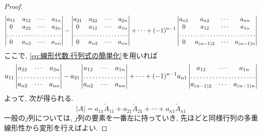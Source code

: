 \begin{proof}
            \begin{equation*}
                \begin{vmatrix}
                    a_{11} & a_{12} & \cdots & a_{1n}\\
                    0 & a_{22} & \cdots & a_{2n}\\
                    \hdotsfor{4}\\
                    0 & a_{n2} & \cdots & a_{nn}
                \end{vmatrix}
                -\begin{vmatrix}
                    a_{21} & a_{22} & \cdots & a_{2n}\\
                    0 & a_{12} & \cdots & a_{1n}\\
                    \hdotsfor{4}\\
                    0 & a_{n2} & \cdots & a_{nn}
                \end{vmatrix}
                +\cdots
                +(-1)^{n-1}\begin{vmatrix}
                    a_{n1} & a_{n2} & \cdots & a_{nn}\\
                    0 & a_{12} & \cdots & a_{1n}\\
                    \hdotsfor{4}\\
                    0 & a_{(n-1)2} & \cdots & a_{(n-1)n}\\
                \end{vmatrix}
            \end{equation*}
            ここで, \eqref{eq:線形代数:行列式の簡単化}を用いれば
            \begin{equation*}
                a_{11}\begin{vmatrix}
                    a_{22} & \cdots & a_{2n}\\
                    \hdotsfor{3}\\
                    a_{n2} & \cdots & a_{nn}
                \end{vmatrix}
                -a_{21}\begin{vmatrix}
                    a_{12} & \cdots & a_{1n}\\
                    \hdotsfor{3}\\
                    a_{n2} & \cdots & a_{nn}
                \end{vmatrix}
                +\cdots
                +(-1)^{n-1}a_{n1}\begin{vmatrix}
                    a_{12} & \cdots & a_{1n}\\
                    \hdotsfor{3}\\
                    a_{(n-1)2} & \cdots & a_{(n-1)n}\\
                \end{vmatrix}
            \end{equation*}
            よって, 次が得られる.
            \begin{equation*}
                |A|=a_{11}\tilde{A}_{11}+a_{21}\tilde{A}_{21} +\cdots+ a_{n1}\tilde{A}_{n1}
            \end{equation*}
            一般の$j$列については, $j$列の要素を一番左に持っていき, 先ほどと同様行列の多重線形性から変形を行えばよい.
        \end{proof}
